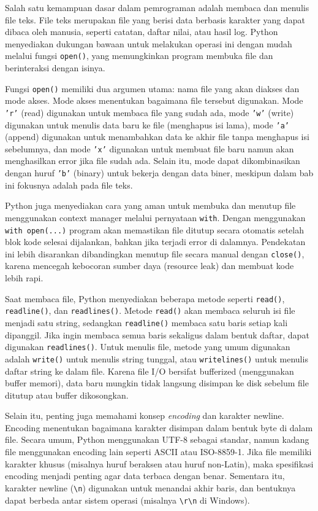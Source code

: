 Salah satu kemampuan dasar dalam pemrograman adalah membaca dan menulis file teks. File teks merupakan file yang berisi data berbasis karakter yang dapat dibaca oleh manusia, seperti catatan, daftar nilai, atau hasil log. Python menyediakan dukungan bawaan untuk melakukan operasi ini dengan mudah melalui fungsi \texttt{open()}, yang memungkinkan program membuka file dan berinteraksi dengan isinya.

Fungsi \texttt{open()} memiliki dua argumen utama: nama file yang akan diakses dan mode akses. Mode akses menentukan bagaimana file tersebut digunakan. Mode \texttt{'r'} (read) digunakan untuk membaca file yang sudah ada, mode \texttt{'w'} (write) digunakan untuk menulis data baru ke file (menghapus isi lama), mode \texttt{'a'} (append) digunakan untuk menambahkan data ke akhir file tanpa menghapus isi sebelumnya, dan mode \texttt{'x'} digunakan untuk membuat file baru namun akan menghasilkan error jika file sudah ada. Selain itu, mode dapat dikombinasikan dengan huruf \texttt{'b'} (binary) untuk bekerja dengan data biner, meskipun dalam bab ini fokusnya adalah pada file teks.

Python juga menyediakan cara yang aman untuk membuka dan menutup file menggunakan context manager melalui pernyataan \texttt{with}. Dengan menggunakan \texttt{with open(...)} program akan memastikan file ditutup secara otomatis setelah blok kode selesai dijalankan, bahkan jika terjadi error di dalamnya. Pendekatan ini lebih disarankan dibandingkan menutup file secara manual dengan \texttt{close()}, karena mencegah kebocoran sumber daya (resource leak) dan membuat kode lebih rapi.

Saat membaca file, Python menyediakan beberapa metode seperti \texttt{read()}, \texttt{readline()}, dan \texttt{readlines()}. Metode \texttt{read()} akan membaca seluruh isi file menjadi satu string, sedangkan \texttt{readline()} membaca satu baris setiap kali dipanggil. Jika ingin membaca semua baris sekaligus dalam bentuk daftar, dapat digunakan \texttt{readlines()}. Untuk menulis file, metode yang umum digunakan adalah \texttt{write()} untuk menulis string tunggal, atau \texttt{writelines()} untuk menulis daftar string ke dalam file. Karena file I/O bersifat bufferized (menggunakan buffer memori), data baru mungkin tidak langsung disimpan ke disk sebelum file ditutup atau buffer dikosongkan.

Selain itu, penting juga memahami konsep \textit{encoding} dan karakter newline. Encoding menentukan bagaimana karakter disimpan dalam bentuk byte di dalam file. Secara umum, Python menggunakan UTF-8 sebagai standar, namun kadang file menggunakan encoding lain seperti ASCII atau ISO-8859-1. Jika file memiliki karakter khusus (misalnya huruf beraksen atau huruf non-Latin), maka spesifikasi encoding menjadi penting agar data terbaca dengan benar. Sementara itu, karakter newline (\texttt{\textbackslash n}) digunakan untuk menandai akhir baris, dan bentuknya dapat berbeda antar sistem operasi (misalnya \texttt{\textbackslash r\textbackslash n} di Windows).

